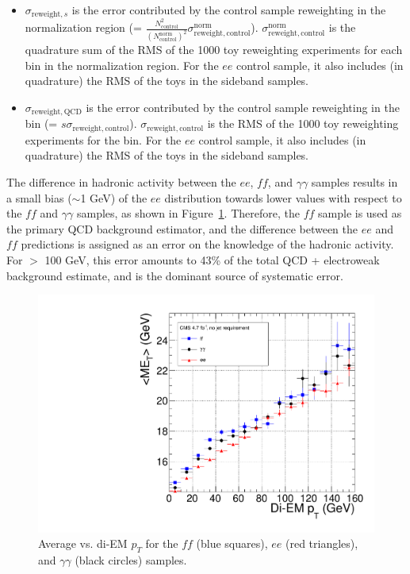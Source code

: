 \documentclass[dissertation.tex]{subfiles}
\begin{document}
\begin{itemize}
\item $\sigma_{\mathrm{reweight,}s}$ is the error contributed by the control sample reweighting in the normalization region (= $\frac{N_{\mathrm{control}}^{2}}{(N_{\mathrm{control}}^{\mathrm{norm}})^{2}}\sigma_{\mathrm{reweight,control}}^{\mathrm{norm}}$).  $\sigma_{\mathrm{reweight,control}}^{\mathrm{norm}}$ is the quadrature sum of the RMS of the 1000 toy reweighting experiments for each \MET bin in the normalization region.  For the $ee$ control sample, it also includes (in quadrature) the RMS of the toys in the sideband samples.

\item $\sigma_{\mathrm{reweight,QCD}}$ is the error contributed by the control sample reweighting in the \MET bin (= $s\sigma_{\mathrm{reweight,control}}$).  $\sigma_{\mathrm{reweight,control}}$ is the RMS of the 1000 toy reweighting experiments for the \MET bin.  For the $ee$ control sample, it also includes (in quadrature) the RMS of the toys in the sideband samples.

\end{itemize}

The difference in hadronic activity between the $ee$, $\mathit{ff}$, and $\gamma\gamma$ samples results in a small bias ($\sim$1 GeV) of the $ee$ \MET distribution towards lower values with respect to the $\mathit{ff}$ and $\gamma\gamma$ samples, as shown in Figure~\ref{fig:avg_MET_vs_di-EM_pT}.  Therefore, the $\mathit{ff}$ sample is used as the primary QCD background estimator, and the difference between the $ee$ and $\mathit{ff}$ predictions is assigned as an error on the knowledge of the hadronic activity.  For \MET $>$ 100 GeV, this error amounts to 43\% of the total QCD + electroweak background estimate, and is the dominant source of systematic error.

\begin{figure}
	\centering
	\includegraphics[scale=0.4]{avg_MET_vs_di-EM_pT}
	\caption{Average \MET vs. di-EM $p_{T}$ for the $\mathit{ff}$ (blue squares), $ee$ (red triangles), and $\gamma\gamma$ (black circles) samples.}
	\label{fig:avg_MET_vs_di-EM_pT}
\end{figure}
\end{document}
